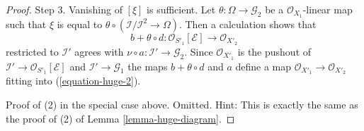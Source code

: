 \documentclass[10pt,a4paper]{amsart}
\theoremstyle{plain}
\theoremstyle{definition}
\theoremstyle{remark}
\numberwithin{equation}{subsection}
\begin{document}
\begin{proof}
\medskip\noindent
Step 3. Vanishing of $[\xi]$ is sufficient. Let
$\theta : \Omega \to \mathcal{G}_2$ be a $\mathcal{O}_{X_1}$-linear map
such that $\xi$ is equal to
$\theta \circ (\mathcal{I}/\mathcal{I}^2 \to \Omega)$.
Then a calculation shows that
$$
b + \theta \circ d : \mathcal{O}_{S'_1}[\mathcal{E}] \to \mathcal{O}_{X'_2}
$$
restricted to $\mathcal{I}'$ agrees with
$\nu \circ a : \mathcal{I}' \to \mathcal{G}_2$. Since $\mathcal{O}_{X'_1}$
is the pushout of $\mathcal{I}' \to \mathcal{O}_{S'_1}[\mathcal{E}]$
and $\mathcal{I}' \to \mathcal{G}_1$ the maps $b + \theta \circ d$
and $a$ define a map
$\mathcal{O}_{X'_1} \to \mathcal{O}_{X'_2}$ fitting into
(\ref{equation-huge-2}).

\medskip\noindent
Proof of (2) in the special case above. Omitted. Hint:
This is exactly the same as the proof of (2) of Lemma \ref{lemma-huge-diagram}.
\end{proof}
\end{document}
